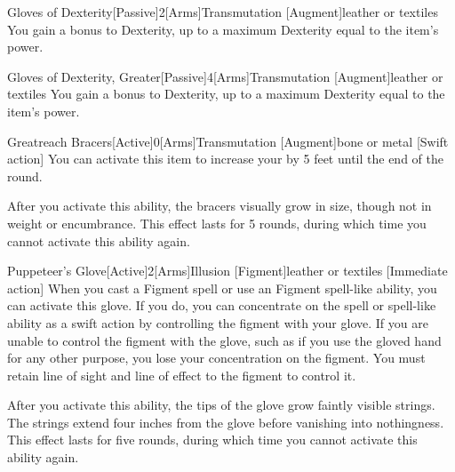         \begin{magicitemdef}{Gloves of Dexterity}[Passive]{2}[Arms]{Transmutation [Augment]}{leather or textiles}
             You gain a  bonus to Dexterity, up to a maximum Dexterity equal to the item's power.
        \end{magicitemdef}

        \begin{magicitemdef}{Gloves of Dexterity, Greater}[Passive]{4}[Arms]{Transmutation [Augment]}{leather or textiles}
             You gain a  bonus to Dexterity, up to a maximum Dexterity equal to the item's power.
        \end{magicitemdef}

        \begin{magicitemdef}{Greatreach Bracers}[Active]{0}[Arms]{Transmutation [Augment]}{bone or metal}
            [Swift action] You can activate this item to increase your  by 5 feet until the end of the round.

            After you activate this ability, the bracers visually grow in size, though not in weight or encumbrance.
            This effect lasts for 5 rounds, during which time you cannot activate this ability again.
        \end{magicitemdef}

        \begin{magicitemdef}{Puppeteer's Glove}[Active]{2}[Arms]{Illusion [Figment]}{leather or textiles}
            [Immediate action] When you cast a Figment spell or use an Figment spell-like ability, you can activate this glove.
            If you do, you can concentrate on the spell or spell-like ability as a swift action by controlling the figment with your glove.
            If you are unable to control the figment with the glove, such as if you use the gloved hand for any other purpose, you lose your concentration on the figment.
            You must retain line of sight and line of effect to the figment to control it.

            After you activate this ability, the tips of the glove grow faintly visible strings.
            The strings extend four inches from the glove before vanishing into nothingness.
            This effect lasts for five rounds, during which time you cannot activate this ability again.
        \end{magicitemdef}

